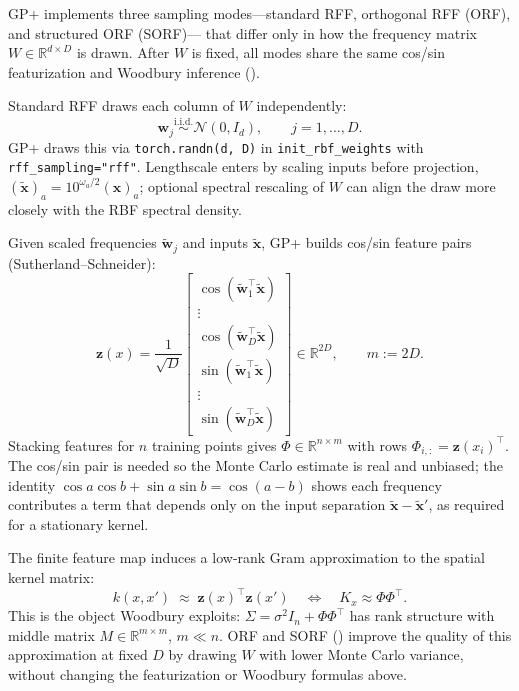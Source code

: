 \documentclass[11pt]{article}
\newcommand{\noise}{\sigma^2}
\newcommand{\Sig}{\Sigma}
\newcommand{\Ph}{\Phi}
\begin{document}
GP+ implements three sampling modes---standard RFF, orthogonal RFF (ORF), and structured ORF (SORF)---
that differ only in how the frequency matrix $W \in \mathbb{R}^{d \times D}$ is drawn.
After $W$ is fixed, all modes share the same cos/sin featurization and Woodbury inference
().

Standard RFF draws each column of $W$ independently:
\begin{equation}
  \label{eq:rff-iid}
  \mathbf w_j \stackrel{\text{i.i.d.}}{\sim} \mathcal{N}(0, I_d),
  \qquad j = 1,\ldots,D.
\end{equation}
GP+ draws this via \texttt{torch.randn(d, D)} in \texttt{init\_rbf\_weights} with
\texttt{rff\_sampling="rff"}.
Lengthscale enters by scaling inputs before projection,
$(\tilde{\mathbf x})_a = 10^{\omega_a/2}(\mathbf x)_a$; optional spectral rescaling of $W$ can align
the draw more closely with the RBF spectral density.

Given scaled frequencies $\tilde{\mathbf w}_j$ and inputs $\tilde{\mathbf x}$, GP+ builds cos/sin
feature pairs (Sutherland--Schneider):
\begin{equation}
  \label{eq:featurize}
  \mathbf z(x)
  = \frac{1}{\sqrt{D}}
  \begin{bmatrix}
    \cos(\tilde{\mathbf w}_1^{\top}\tilde{\mathbf x}) \\
    \vdots \\
    \cos(\tilde{\mathbf w}_D^{\top}\tilde{\mathbf x}) \\
    \sin(\tilde{\mathbf w}_1^{\top}\tilde{\mathbf x}) \\
    \vdots \\
    \sin(\tilde{\mathbf w}_D^{\top}\tilde{\mathbf x})
  \end{bmatrix}
  \in \mathbb{R}^{2D},
  \qquad m := 2D.
\end{equation}
Stacking features for $n$ training points gives $\Ph \in \mathbb{R}^{n \times m}$ with rows
$\Ph_{i,:} = \mathbf z(x_i)^\top$.
The cos/sin pair is needed so the Monte Carlo estimate is real and unbiased; the identity
$\cos a \cos b + \sin a \sin b = \cos(a-b)$ shows each frequency contributes a term that depends only
on the input separation $\tilde{\mathbf x} - \tilde{\mathbf x}'$, as required for a stationary kernel.

The finite feature map induces a low-rank Gram approximation to the spatial kernel matrix:
\begin{equation}
  \label{eq:rff-kernel}
  k(x, x') \;\approx\; \mathbf z(x)^\top \mathbf z(x')
  \quad\Longleftrightarrow\quad
  K_x \approx \Ph\Ph^\top.
\end{equation}
This is the object Woodbury exploits: $\Sig = \noise I_n + \Ph\Ph^\top$ has rank structure with
middle matrix $M \in \mathbb{R}^{m \times m}$, $m \ll n$.
ORF and SORF () improve the quality of this approximation at
fixed $D$ by drawing $W$ with lower Monte Carlo variance, without changing the featurization or
Woodbury formulas above.
\end{document}
